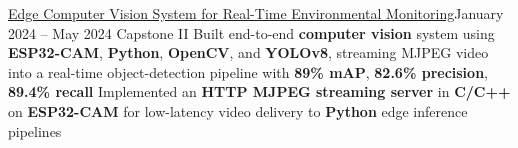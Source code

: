 
\subheading
    {\href{https://github.com/lynkos/algae-detection}{Edge Computer Vision System for Real-Time Environmental Monitoring}}{January 2024 -- May 2024}
    {Capstone II}{}
    \itemListStart
    \listItem{}
        {Built end-to-end \textbf{computer vision} system using \textbf{ESP32-CAM}, \textbf{Python}, \textbf{OpenCV}, and \textbf{YOLOv8}, streaming MJPEG video into a real-time object-detection pipeline with \textbf{89\% mAP}, \textbf{82.6\% precision}, \textbf{89.4\% recall}}
    \listItem{}
        {Implemented an \textbf{HTTP MJPEG streaming server} in \textbf{C/C++} on \textbf{ESP32-CAM} for low-latency video delivery to \textbf{Python} edge inference pipelines}
